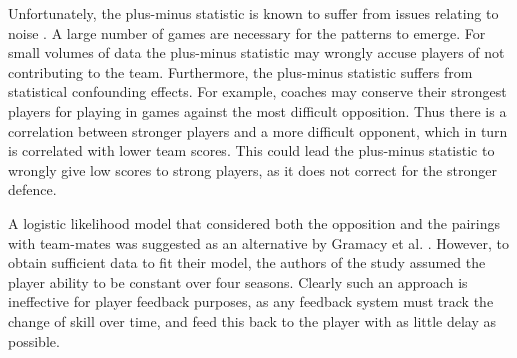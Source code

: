 Unfortunately, the plus-minus statistic is known to suffer from issues
relating to noise \cite{gramacy_estimating_2012}. A large number of
games are necessary for the patterns to emerge. For small volumes of
data the plus-minus statistic may wrongly accuse players of not
contributing to the team. Furthermore, the plus-minus statistic suffers
from statistical confounding effects. For example, coaches may conserve
their strongest players for playing in games against the most difficult
opposition. Thus there is a correlation between stronger players and a
more difficult opponent, which in turn is correlated with lower team
scores. This could lead the plus-minus statistic to wrongly give low scores to strong players, as it does not correct for the stronger defence.

A logistic likelihood model that considered both the opposition and the pairings with team-mates was suggested as an alternative by Gramacy et al. \cite{gramacy_estimating_2012}. However, to obtain sufficient data to fit their model, the authors of the study assumed the player ability to be constant over four seasons. Clearly such an approach is ineffective for player feedback purposes, as any feedback system must track the change of skill over time, and feed this back to the player with as little delay as possible.

